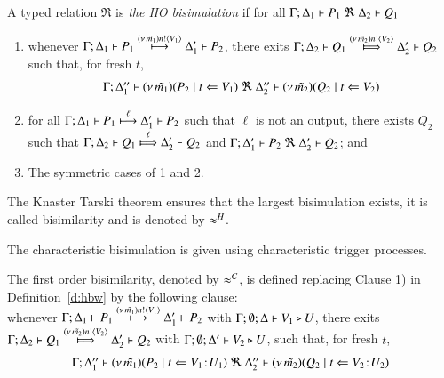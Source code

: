 \begin{definition}\rm
	\label{d:hbw}
A typed relation $\Re$ is {\em the HO bisimulation} if 
for all $\horel{\Gamma}{\Delta_1}{P_1}{\ \Re \ }{\Delta_2}{Q_1}$ 
\begin{enumerate}
\item 
whenever 
$\Gamma; \Delta_1 \vdash P_1 \stackrel{(\nu\, \tilde{m_1}) n ! \langle V_1 \rangle}{\longmapsto} \Delta_1' \vdash P_2$, there exits 
$\horel{\Gamma}{\Delta_2}{Q_1}{\Hby{\news{\tilde{m_2}} \bactout{n}{V_2}}}{\Delta_2'}{Q_2}$ such that, for fresh $t$, 
\[
\begin{array}{lrlll}
\Gamma; \Delta''_1  \vdash  {(\nu\, \tilde{m_1})(P_2 \;|\;t \Leftarrow V_1)}
\ \Re 
\ \Delta''_2 \vdash {(\nu\, \tilde{m_2})(Q_2 \;|\;t \Leftarrow V_2)}
\end{array}
\]
		\item	
for all $\Gamma; \Delta_1 \vdash P_1 \stackrel{\ell}{\longmapsto} \Delta_1' \vdash P_2$ such that 
$\ell$ is not an output, 
 there exists $Q_2$ such that 
$\horel{\Gamma}{\Delta_2}{Q_1}{\Hby{\ell}}{\Delta_2'}{Q_2}$
			and
			$\horel{\Gamma}{\Delta_1'}{P_2}{\ \Re \ }{\Delta_2'}{Q_2}$; and 

                      \item	The symmetric cases of 1 and 2.                
	\end{enumerate}
	The Knaster Tarski theorem ensures that the largest bisimulation exists,
	it is called bisimilarity and is denoted by $\approx^H$.
\end{definition}

\smallskip 

The characteristic bisimulation is given using 
characteristic trigger processes. 

\smallskip 

\begin{definition}\rm
\label{d:fwb}
The first order bisimilarity, denoted by $\approx^C$, is defined replacing 
Clause 1) in Definition~\ref{d:hbw} by the following clause:\\[1mm]
whenever 
$\Gamma; \Delta_1 \vdash P_1 \stackrel{(\nu\, \tilde{m_1}) n ! \langle V_1 \rangle}{\longmapsto} \Delta_1' \vdash P_2$ with $\Gamma; \emptyset; \Delta \vdash V_1 \triangleright U$,  
there exits 
$\horel{\Gamma}{\Delta_2}{Q_1}{\Hby{\news{\tilde{m_2}}\bactout{n}{V_2}}}{\Delta_2'}{Q_2}$ with $\Gamma; \emptyset; \Delta' \vdash V_2 \triangleright U$,  
such that, for fresh $t$, 
\[
\begin{array}{lrlll}
\Gamma; \Delta''_1  \vdash  {(\nu\, \tilde{m_1})(P_2 \;|\;t \Leftarrow V_1 \! : \! U_1)}
\ \Re 
\ \Delta''_2 \vdash {(\nu\, \tilde{m_2})(Q_2 \;|\;t \Leftarrow V_2 \! : \! U_2)}
\end{array}
\]
\end{definition}

